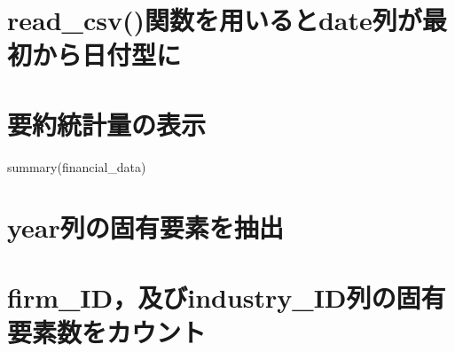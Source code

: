 \documentclass[
  letterpaper,
  DIV=11,
  numbers=noendperiod]{scrreprt}
\newenvironment{Shaded}{\begin{snugshade}}{\end{snugshade}}
\newcommand{\FunctionTok}[1]{\textcolor[rgb]{0.28,0.35,0.67}{#1}}
\newcommand{\NormalTok}[1]{\textcolor[rgb]{0.00,0.23,0.31}{#1}}
\newcommand{\OtherTok}[1]{\textcolor[rgb]{0.00,0.23,0.31}{#1}}
\newcommand{\SpecialCharTok}[1]{\textcolor[rgb]{0.37,0.37,0.37}{#1}}
\newcommand{\StringTok}[1]{\textcolor[rgb]{0.13,0.47,0.30}{#1}}
\begin{document}
\section{read\_csv()関数を用いるとdate列が最初から日付型に}\label{read_csvux95a2ux6570ux3092ux7528ux3044ux308bux3068dateux5217ux304cux6700ux521dux304bux3089ux65e5ux4ed8ux578bux306b}

\begin{Shaded}
\end{Shaded}

\section{要約統計量の表示}\label{ux8981ux7d04ux7d71ux8a08ux91cfux306eux8868ux793a}

\begin{Shaded}
\begin{Highlighting}[]
\FunctionTok{summary}\NormalTok{(financial\_data)}
\end{Highlighting}
\end{Shaded}

\section{year列の固有要素を抽出}\label{yearux5217ux306eux56faux6709ux8981ux7d20ux3092ux62bdux51fa}

\begin{Shaded}
\end{Shaded}

\section{firm\_ID，及びindustry\_ID列の固有要素数をカウント}\label{firm_idux53caux3073industry_idux5217ux306eux56faux6709ux8981ux7d20ux6570ux3092ux30abux30a6ux30f3ux30c8}

\begin{Shaded}
\end{Shaded}
\end{document}
